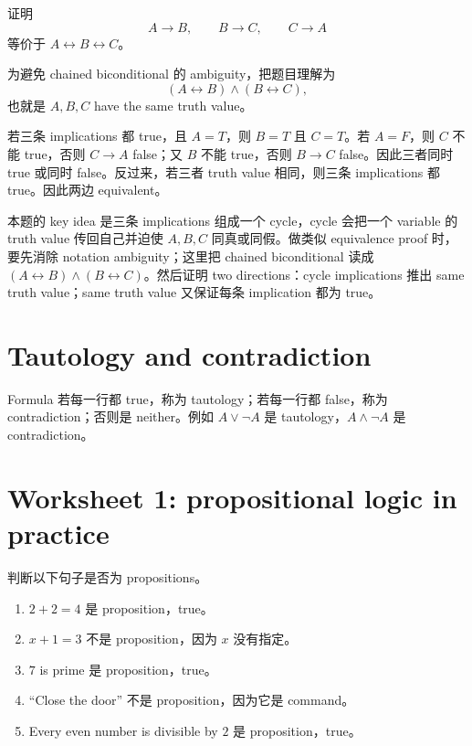 \begin{exerciseblock}
证明
\[
A\to B,\qquad B\to C,\qquad C\to A
\]
等价于 \(A\leftrightarrow B\leftrightarrow C\)。
\end{exerciseblock}

\begin{solution}
为避免 chained biconditional 的 ambiguity，把题目理解为
\[
(A\leftrightarrow B)\land(B\leftrightarrow C),
\]
也就是 \(A,B,C\) have the same truth value。

若三条 implications 都 true，且 \(A=T\)，则 \(B=T\) 且 \(C=T\)。若 \(A=F\)，则 \(C\) 不能 true，否则 \(C\to A\) false；又 \(B\) 不能 true，否则 \(B\to C\) false。因此三者同时 true 或同时 false。反过来，若三者 truth value 相同，则三条 implications 都 true。因此两边 equivalent。
\end{solution}

\begin{explanation}
本题的 key idea 是三条 implications 组成一个 cycle，cycle 会把一个 variable 的 truth value 传回自己并迫使 \(A,B,C\) 同真或同假。做类似 equivalence proof 时，要先消除 notation ambiguity；这里把 chained biconditional 读成 \((A\leftrightarrow B)\land(B\leftrightarrow C)\)。然后证明 two directions：cycle implications 推出 same truth value；same truth value 又保证每条 implication 都为 true。
\end{explanation}

\section{Tautology and contradiction}

Formula 若每一行都 true，称为 tautology；若每一行都 false，称为 contradiction；否则是 neither。例如 \(A\lor\lnot A\) 是 tautology，\(A\land\lnot A\) 是 contradiction。

\section{Worksheet 1: propositional logic in practice}

\begin{exerciseblock}
判断以下句子是否为 propositions。
\end{exerciseblock}

\begin{solution}
\begin{enumerate}[label=(\alph*)]
  \item \(2+2=4\) 是 proposition，true。
  \item \(x+1=3\) 不是 proposition，因为 \(x\) 没有指定。
  \item \(7\) is prime 是 proposition，true。
  \item ``Close the door'' 不是 proposition，因为它是 command。
  \item Every even number is divisible by \(2\) 是 proposition，true。
\end{enumerate}
\end{solution}

